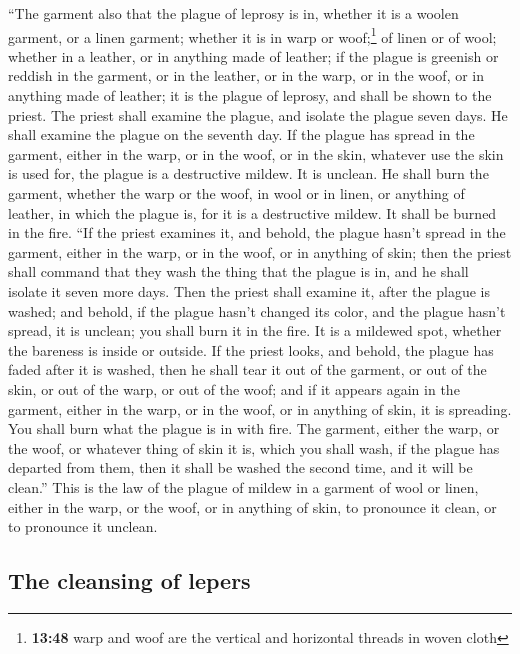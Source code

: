 ``The garment also that the plague of leprosy is in,
whether it is a woolen garment, or a linen garment; 
whether it is in warp or woof;\footnote{\textbf{13:48} warp and woof are
  the vertical and horizontal threads in woven cloth} of linen or of
wool; whether in a leather, or in anything made of leather;
 if the plague is greenish or reddish in the garment, or
in the leather, or in the warp, or in the woof, or in anything made of
leather; it is the plague of leprosy, and shall be shown to the priest.
 The priest shall examine the plague, and isolate the
plague seven days.  He shall examine the plague on the
seventh day. If the plague has spread in the garment, either in the
warp, or in the woof, or in the skin, whatever use the skin is used for,
the plague is a destructive mildew. It is unclean.  He
shall burn the garment, whether the warp or the woof, in wool or in
linen, or anything of leather, in which the plague is, for it is a
destructive mildew. It shall be burned in the fire.  ``If
the priest examines it, and behold, the plague hasn't spread in the
garment, either in the warp, or in the woof, or in anything of skin;
 then the priest shall command that they wash the thing
that the plague is in, and he shall isolate it seven more days.
 Then the priest shall examine it, after the plague is
washed; and behold, if the plague hasn't changed its color, and the
plague hasn't spread, it is unclean; you shall burn it in the fire. It
is a mildewed spot, whether the bareness is inside or outside.
 If the priest looks, and behold, the plague has faded
after it is washed, then he shall tear it out of the garment, or out of
the skin, or out of the warp, or out of the woof;  and if
it appears again in the garment, either in the warp, or in the woof, or
in anything of skin, it is spreading. You shall burn what the plague is
in with fire.  The garment, either the warp, or the woof,
or whatever thing of skin it is, which you shall wash, if the plague has
departed from them, then it shall be washed the second time, and it will
be clean.''  This is the law of the plague of mildew in a
garment of wool or linen, either in the warp, or the woof, or in
anything of skin, to pronounce it clean, or to pronounce it unclean.

\hypertarget{the-cleansing-of-lepers}{%
\subsection{The cleansing of lepers}\label{the-cleansing-of-lepers}}


